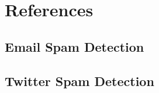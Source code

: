 \section{References}
\label{sec:references}

\subsection{Email Spam Detection}

\subsection{Twitter Spam Detection}
